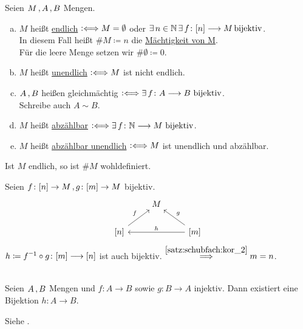 \documentclass[../ana1.tex]{subfiles}
\begin{document}
\begin{defi}
	Seien \(M \operatorname{,} A \operatorname{,} B \) Mengen.
	\begin{enumerate}[(a)]
		\item \(M \) heißt \underline{endlich} \(\mathrel{\vcentcolon\Longleftrightarrow} M = \emptyset \) oder \(\exists \, n \in \mathbb{N} \, \exists \, f \colon [n] \longrightarrow M \operatorname{bijektiv} \). \\
			  In diesem Fall heißt \(\#M \coloneqq n \) die \underline{Mächtigkeit von M}. \\
			  Für die leere Menge setzen wir \(\#\emptyset \coloneqq 0 \). \\
		\item \(M \) heißt \underline{unendlich} \(\mathrel{\vcentcolon\Longleftrightarrow} M \) ist nicht endlich.
		\item \(A \operatorname{,} B \) heißen gleichmächtig \(\mathrel{\vcentcolon\Longleftrightarrow} \exists \, f \colon A \longrightarrow B \, \operatorname{bijektiv} \). \\
			  Schreibe auch \(A \sim B\).
		\item \(M \) heißt \underline{abzählbar} \(\mathrel{\vcentcolon\Longleftrightarrow} \exists \, f \colon \mathbb{N} \longrightarrow M \, \operatorname{bijektiv} \).
		\item \(M \) heißt \underline{abzählbar unendlich} \(\mathrel{\vcentcolon\Longleftrightarrow} M \) ist unendlich und abzählbar.
	\end{enumerate}
\end{defi}

\begin{bem}
	Ist \(M \) endlich, so ist \(\#M \) wohldefiniert.
\end{bem}
\begin{bew}
	Seien \(f \colon [n] \rightarrow M \operatorname{,} g \colon [m] \rightarrow M \) bijektiv.
	\[\begin{tikzcd}
		& M &  \\
	   {[n]} \arrow[ru, "f"] &  & {[m]} \arrow[lu, "g"'] \arrow[ll, "h"']
	\end{tikzcd}\]
	\( h \coloneqq \inverse{f} \circ g \colon [m] \longrightarrow [n] \) ist auch bijektiv. \(\overset{\autoref{satz:schubfach:kor_2}}{\implies} m=n \).
\end{bew}

\iftoggle{short}{}{\newpage}%

\begin{bem}\label{satz:cantor_Berenstein}\leavevmode \\
	Seien \(A \operatorname{,} B \) Mengen und \(f \colon A \longrightarrow B \) sowie \(g \colon B \longrightarrow A \) injektiv.
	Dann existiert eine Bijektion \(h \colon A \longrightarrow B \).
\end{bem}
\begin{bew}
	Siehe \cite[Kolmogorov-Fomin: Introductory Real Analysis]{Kolmogorov}.
\end{bew}
\end{document}
